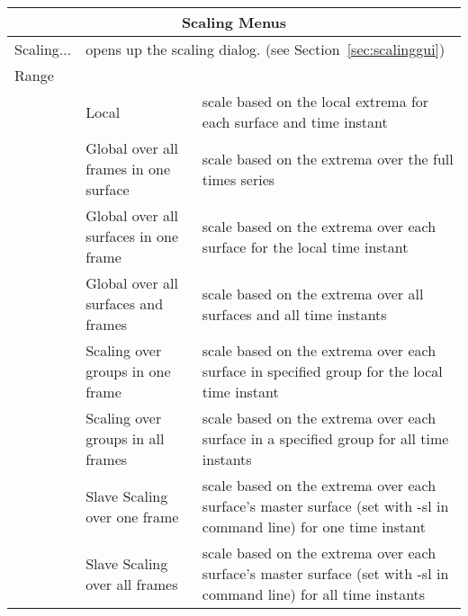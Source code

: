 \begin{table}[ht]
  \begin{center}
    \begin{tabular}{|l|l|p{3 in}|} \hline
      \multicolumn{3}{|c|}{\textbf{Scaling Menus}} \\ \hline
    Scaling... & \multicolumn{2}{|l|}{opens up the scaling dialog.  (see
    Section~\ref{sec:scalinggui})} \\
    Range & & \\
    &  Local  & scale based on the local extrema for each surface and time
       instant \\
    &  Global over all frames in one surface  & scale based on the extrema 
        over the full times series \\ \hline
    &  Global over all surfaces in one frame & scale based on the extrema over 
        each surface for the local time instant\\
    &  Global over all surfaces and frames & scale based on the extrema
    over all surfaces 
       and all time instants\\
    &  Scaling over groups in one frame & scale based on the extrema over 
        each surface in specified group for the local time instant\\
    &  Scaling over groups in all frames & scale based on the extrema over 
        each surface in a specified group for all time instants\\
    &  Slave Scaling over one frame & scale based on the extrema over 
        each surface's master surface (set with -sl in command line)
        for one time instant\\
    &  Slave Scaling over all frames & scale based on the extrema over 
        each surface's master surface (set with -sl in command line)
        for all time instants\\ \hline


\end{tabular}
\end{center}
\end{table}
